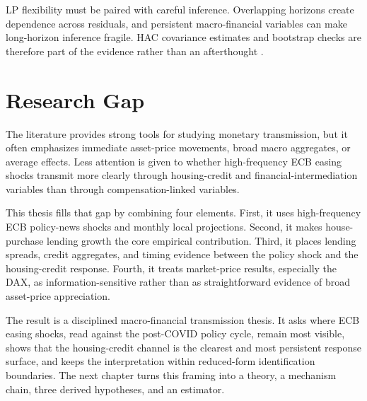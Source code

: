 LP flexibility must be paired with careful inference. Overlapping horizons create dependence across residuals, and persistent macro-financial variables can make long-horizon inference fragile. HAC covariance estimates and bootstrap checks are therefore part of the evidence rather than an afterthought \parencite{NeweyWest1987}.

\section{Research Gap}

The literature provides strong tools for studying monetary transmission, but it often emphasizes immediate asset-price movements, broad macro aggregates, or average effects. Less attention is given to whether high-frequency ECB easing shocks transmit more clearly through housing-credit and financial-intermediation variables than through compensation-linked variables.

This thesis fills that gap by combining four elements. First, it uses high-frequency ECB policy-news shocks and monthly local projections. Second, it makes house-purchase lending growth the core empirical contribution. Third, it places lending spreads, credit aggregates, and timing evidence between the policy shock and the housing-credit response. Fourth, it treats market-price results, especially the DAX, as information-sensitive rather than as straightforward evidence of broad asset-price appreciation.

The result is a disciplined macro-financial transmission thesis. It asks where ECB easing shocks, read against the post-COVID policy cycle, remain most visible, shows that the housing-credit channel is the clearest and most persistent response surface, and keeps the interpretation within reduced-form identification boundaries. The next chapter turns this framing into a theory, a mechanism chain, three derived hypotheses, and an estimator.
